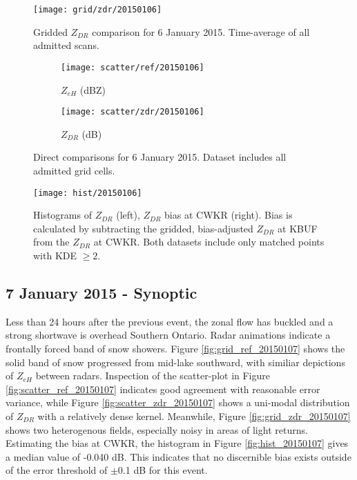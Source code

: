 \begin{figure}[H]
\texttt{[image: grid/zdr/20150106]}
\caption{Gridded $Z_{DR}$ comparison for 6 January 2015. Time-average of all admitted scans.} 
\label{fig:grid_zdr_20150106}
\end{figure}

\begin{figure}[H]
\centering
   \begin{subfigure}{0.49\linewidth} \centering
     \texttt{[image: scatter/ref/20150106]}
     \caption{$Z_{eH}$ (dBZ)}\label{fig:scatter_ref_20150106}
   \end{subfigure}
   \begin{subfigure}{0.49\linewidth} \centering
     \texttt{[image: scatter/zdr/20150106]}
     \caption{$Z_{DR}$ (dB)}\label{fig:scatter_zdr_20150106}
   \end{subfigure}
\caption{Direct comparisons for 6 January 2015. Dataset includes all admitted grid cells.} \label{fig:scatter_20150106}
\end{figure}

\begin{figure}[H]
\texttt{[image: hist/20150106]}\centering
\caption{Histograms of $Z_{DR}$ (left), $Z_{DR}$ bias at CWKR (right). Bias is calculated by subtracting the gridded, bias-adjusted $Z_{DR}$ at KBUF from the
$Z_{DR}$ at CWKR. Both datasets include only matched points with KDE $\geq 2$.} 
\label{fig:hist_20150106}
\end{figure}

\subsection{7 January 2015 - Synoptic}
Less than 24 hours after the previous event, the zonal flow has buckled and a strong shortwave is overhead Southern Ontario. Radar animations indicate a
frontally forced band of snow showers. Figure \ref{fig:grid_ref_20150107} shows the solid band of snow progressed from mid-lake southward, with similiar
depictions of $Z_{eH}$ between radars. Inspection of the scatter-plot in Figure \ref{fig:scatter_ref_20150107} indicates good agreement with reasonable error
variance, while Figure \ref{fig:scatter_zdr_20150107} shows a uni-modal distribution of $Z_{DR}$ with a relatively dense kernel.
Meanwhile, Figure \ref{fig:grid_zdr_20150107} shows two heterogenous fields, especially noisy in areas of light returns. 
Estimating the bias at CWKR, the histogram in Figure \ref{fig:hist_20150107} gives a median value of -0.040 dB. This indicates that no discernible bias
exists outside of the error threshold of $\pm$0.1 dB for this event.


